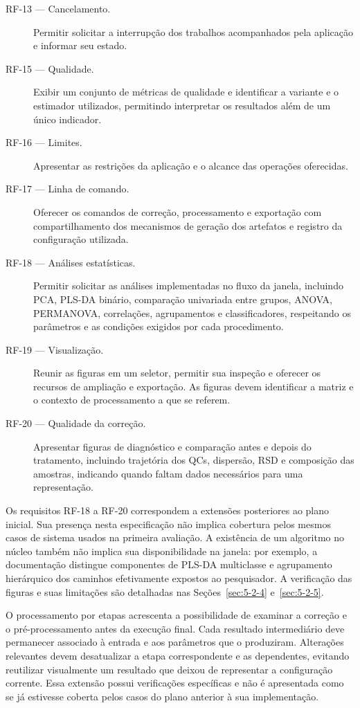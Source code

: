 \begin{description}
\item[RF-13 --- Cancelamento.] Permitir solicitar a interrupção dos trabalhos acompanhados pela aplicação e informar seu estado.
\item[RF-15 --- Qualidade.] Exibir um conjunto de métricas de qualidade e identificar a variante e o estimador utilizados, permitindo interpretar os resultados além de um único indicador.
\item[RF-16 --- Limites.] Apresentar as restrições da aplicação e o alcance das operações oferecidas.
\item[RF-17 --- Linha de comando.] Oferecer os comandos de correção, processamento e exportação com compartilhamento dos mecanismos de geração dos artefatos e registro da configuração utilizada.
\item[RF-18 --- Análises estatísticas.] Permitir solicitar as análises implementadas no fluxo da janela, incluindo PCA, PLS-DA binário, comparação univariada entre grupos, ANOVA, PERMANOVA, correlações, agrupamentos e classificadores, respeitando os parâmetros e as condições exigidos por cada procedimento.
\item[RF-19 --- Visualização.] Reunir as figuras em um seletor, permitir sua inspeção e oferecer os recursos de ampliação e exportação. As figuras devem identificar a matriz e o contexto de processamento a que se referem.
\item[RF-20 --- Qualidade da correção.] Apresentar figuras de diagnóstico e comparação antes e depois do tratamento, incluindo trajetória dos QCs, dispersão, RSD e composição das amostras, indicando quando faltam dados necessários para uma representação.
\end{description}

Os requisitos RF-18 a RF-20 correspondem a extensões posteriores ao plano inicial. Sua presença nesta especificação não implica cobertura pelos mesmos casos de sistema usados na primeira avaliação. A existência de um algoritmo no núcleo também não implica sua disponibilidade na janela: por exemplo, a documentação distingue componentes de PLS-DA multiclasse e agrupamento hierárquico dos caminhos efetivamente expostos ao pesquisador. A verificação das figuras e suas limitações são detalhadas nas Seções~\ref{sec:5-2-4} e~\ref{sec:5-2-5}.

O processamento por etapas acrescenta a possibilidade de examinar a correção e o pré-processamento antes da execução final. Cada resultado intermediário deve permanecer associado à entrada e aos parâmetros que o produziram. Alterações relevantes devem desatualizar a etapa correspondente e as dependentes, evitando reutilizar visualmente um resultado que deixou de representar a configuração corrente. Essa extensão possui verificações específicas e não é apresentada como se já estivesse coberta pelos casos do plano anterior à sua implementação.

